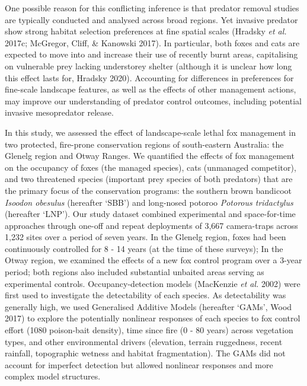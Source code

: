 \documentclass[11pt,a4paper,titlepage,twoside,openright]{style/unimelbthesis}
\begin{document}
\begin{mainmatter}
One possible reason for this conflicting inference is that predator removal studies are typically conducted and analysed across broad regions. Yet invasive predator show strong habitat selection preferences at fine spatial scales (Hradsky \emph{et al.} 2017c; McGregor, Cliff, \& Kanowski 2017). In particular, both foxes and cats are expected to move into and increase their use of recently burnt areas, capitalising on vulnerable prey lacking understorey shelter (although it is unclear how long this effect lasts for, Hradsky 2020). Accounting for differences in preferences for fine-scale landscape features, as well as the effects of other management actions, may improve our understanding of predator control outcomes, including potential invasive mesopredator release.

In this study, we assessed the effect of landscape-scale lethal fox management in two protected, fire-prone conservation regions of south-eastern Australia: the Glenelg region and Otway Ranges. We quantified the effects of fox management on the occupancy of foxes (the managed species), cats (unmanaged competitor), and two threatened species (important prey species of both predators) that are the primary focus of the conservation programs: the southern brown bandicoot \emph{Isoodon obesulus} (hereafter `SBB') and long-nosed potoroo \emph{Potorous tridactylus} (hereafter `LNP'). Our study dataset combined experimental and space-for-time approaches through one-off and repeat deployments of 3,667 camera-traps across 1,232 sites over a period of seven years. In the Glenelg region, foxes had been continuously controlled for 8 - 14 years (at the time of these surveys); In the Otway region, we examined the effects of a new fox control program over a 3-year period; both regions also included substantial unbaited areas serving as experimental controls. Occupancy-detection models (MacKenzie \emph{et al.} 2002) were first used to investigate the detectability of each species. As detectability was generally high, we used Generalised Additive Models (hereafter `GAMs', Wood 2017) to explore the potentially nonlinear responses of each species to fox control effort (1080 poison-bait density), time since fire (0 - 80 years) across vegetation types, and other environmental drivers (elevation, terrain ruggedness, recent rainfall, topographic wetness and habitat fragmentation). The GAMs did not account for imperfect detection but allowed nonlinear responses and more complex model structures.


\end{mainmatter}
\end{document}
